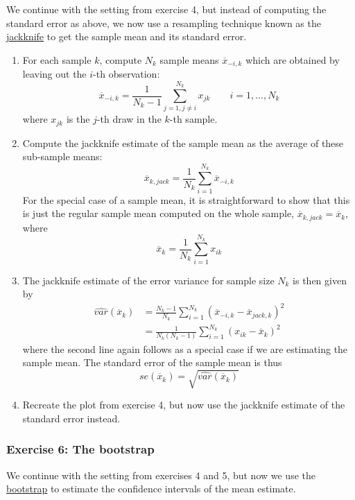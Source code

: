 \documentclass{scrartcl}
\providecommand{\tightlist}{%
      \setlength{\itemsep}{0pt}\setlength{\parskip}{0pt}}
\begin{document}
We continue with the setting from exercise 4, but instead of computing
the standard error as above, we now use a resampling technique known as
the \href{https://en.wikipedia.org/wiki/Jackknife_resampling}{jackknife}
to get the sample mean and its standard error.

\begin{enumerate}
\def\labelenumi{\arabic{enumi}.}
\tightlist
\item
  For each sample \(k\), compute \(N_k\) sample means
  \(\overline{x}_{-i,k}\) which are obtained by leaving out the \(i\)-th
  observation: \[
  \overline{x}_{-i,k} = \frac{1}{N_k-1}\sum_{j = 1, j \neq i}^{N_k} x_{jk} 
  \qquad i = 1,\dots,N_k
  \] where \(x_{jk}\) is the \(j\)-th draw in the \(k\)-th sample.
\item
  Compute the jackknife estimate of the sample mean as the average of
  these sub-sample means: \[
  \overline{x}_{k,jack} = \frac{1}{N_k}\sum_{i=1}^{N_k} \overline{x}_{-i,k}
  \] For the special case of a sample mean, it is straightforward to
  show that this is just the regular sample mean computed on the whole
  sample, \(\overline{x}_{k,jack} = \overline{x}_k\), where \[
  \overline{x}_k = \frac{1}{N_k}\sum_{i=1}^{N_k} x_{ik}
  \]
\item
  The jackknife estimate of the error variance for sample size \(N_k\)
  is then given by \[
  \begin{aligned}
  \widehat{var}(\overline{x}_k) 
      &= \frac{N_k - 1}{N_k} \sum_{i=1}^{N_k}\left(
              \overline{x}_{-i,k} - \overline{x}_{jack,k}\right)^2 \\
      &= \frac{1}{N_k(N_k-1)} \sum_{i=1}^{N_k}(x_{ik}-\overline{x}_k)^2
  \end{aligned}
  \] where the second line again follows as a special case if we are
  estimating the sample mean. The standard error of the sample mean is
  thus \[
  se(\overline{x}_k) = \sqrt{\widehat{var}(\overline{x}_k)}
  \]
\item
  Recreate the plot from exercise 4, but now use the jackknife estimate
  of the standard error instead.
\end{enumerate}

    \hypertarget{exercise-6-the-bootstrap}{%
\subsubsection{Exercise 6: The
bootstrap}\label{exercise-6-the-bootstrap}}

We continue with the setting from exercises 4 and 5, but now we use the
\href{https://en.wikipedia.org/wiki/Bootstrapping_(statistics)\#Case_resampling}{bootstrap}
to estimate the confidence intervals of the mean estimate.
\end{document}
